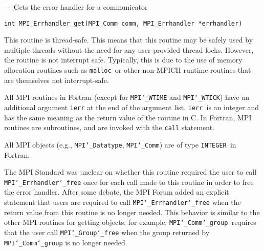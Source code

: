 \startmanpage
{}
--- Gets the error handler for a communicator 
\startvb\begin{verbatim}
int MPI_Errhandler_get(MPI_Comm comm, MPI_Errhandler *errhandler)

\end{verbatim}
\endvb

\par
{}
\par
{}
\par
This routine is thread-safe.  This means that this routine may be
safely used by multiple threads without the need for any user-provided
thread locks.  However, the routine is not interrupt safe.  Typically,
this is due to the use of memory allocation routines such as {\tt malloc
}or other non-MPICH runtime routines that are themselves not interrupt-safe.
\par
{}
All MPI routines in Fortran (except for {\tt MPI{\tt \char`\_}WTIME} and {\tt MPI{\tt \char`\_}WTICK}) have
an additional argument {\tt ierr} at the end of the argument list.  {\tt ierr
}is an integer and has the same meaning as the return value of the routine
in C.  In Fortran, MPI routines are subroutines, and are invoked with the
{\tt call} statement.
\par
All MPI objects (e.g., {\tt MPI{\tt \char`\_}Datatype}, {\tt MPI{\tt \char`\_}Comm}) are of type {\tt INTEGER
}in Fortran.
\par
{}
\par
The MPI Standard was unclear on whether this routine required the user to call
{\tt MPI{\tt \char`\_}Errhandler{\tt \char`\_}free} once for each call made to this routine in order to
free the error handler.  After some debate, the MPI Forum added an explicit
statement that users are required to call {\tt MPI{\tt \char`\_}Errhandler{\tt \char`\_}free} when the
return value from this routine is no longer needed.  This behavior is similar
to the other MPI routines for getting objects; for example, {\tt MPI{\tt \char`\_}Comm{\tt \char`\_}group
}requires that the user call {\tt MPI{\tt \char`\_}Group{\tt \char`\_}free} when the group returned
by {\tt MPI{\tt \char`\_}Comm{\tt \char`\_}group} is no longer needed.
